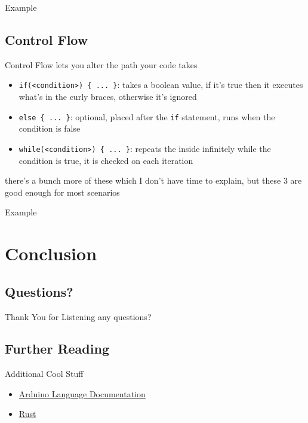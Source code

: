 \documentclass{beamer}
\newcommand{\examplefile}[1]{
	
}
\newcommand{\link}[2]{\href{#1}{\color{blue}#2}}
\begin{document}
	\begin{frame}[fragile]{Example}
		\examplefile{functions.cxx}
	\end{frame}

	\subsection{Control Flow}
	\begin{frame}[fragile]{Control Flow}
		lets you alter the path your code takes
		\begin{itemize}
			\item \verb|if(<condition>) { ... }|: takes a boolean value, if it's true then it executes what's in the curly braces, otherwise it's ignored
			\item \verb|else { ... }|: optional, placed after the \verb|if| statement, runs when the condition is false
			\item \verb|while(<condition>) { ... }|: repeats the inside infinitely while the condition is true, it is checked on each iteration
		\end{itemize}
		there's a bunch more of these which I don't have time to explain, but these 3 are good enough for most scenarios
	\end{frame}

	\begin{frame}[fragile]{Example}
		\examplefile{control\_flow.cxx}
	\end{frame}

	\section{Conclusion}
	\subsection{Questions?}
	\begin{frame}{Thank You for Listening}
		any questions?
	\end{frame}

	\subsection{Further Reading}
	\begin{frame}{Additional Cool Stuff}
		\begin{itemize}
			\item \link{https://www.arduino.cc/reference/en/}{Arduino Language Documentation}
			\item \link{https://www.rust-lang.org/}{Rust}
		\end{itemize}
	\end{frame}
\end{document}
